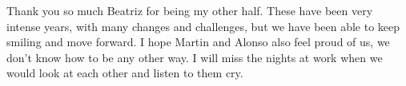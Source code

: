 \begin{acknowledgementslong}
Thank you so much Beatriz for being my other half. These have been very intense years, with many changes and challenges, but we have been able to keep smiling and move forward. I hope Martin and Alonso also feel proud of us, we don't know how to be any other way. I will miss the nights at work when we would look at each other and listen to them cry. 



\end{acknowledgementslong}



